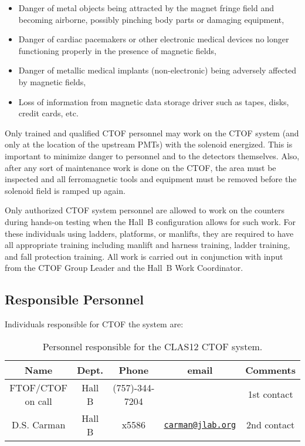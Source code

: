 \begin{itemize}
\item Danger of metal objects being attracted by the magnet fringe field and becoming airborne, 
possibly pinching body parts or damaging equipment,
\item Danger of cardiac pacemakers or other electronic medical devices no longer functioning 
properly in the presence of magnetic fields,
\item Danger of metallic medical implants (non-electronic) being adversely affected by magnetic 
fields,
\item Loss of information from magnetic data storage driver such as tapes, disks, credit cards, 
etc.
\end{itemize}

Only trained and qualified CTOF personnel may work on the CTOF system (and only at the 
location of the upstream PMTs) with the solenoid energized. This is important to minimize 
danger to personnel and to the detectors themselves. Also, after any sort of maintenance 
work is done on the CTOF, the area must be inspected and all ferromagnetic tools and 
equipment must be removed before the solenoid field is ramped up again.

Only authorized CTOF system personnel are allowed to work on the counters during hands-on
testing when the Hall~B configuration allows for such work. For these individuals using 
ladders, platforms, or manlifts, they are required to have all appropriate training 
including manlift and harness training, ladder training, and fall protection training. All 
work is carried out in conjunction with input from the CTOF Group Leader and the Hall~B Work 
Coordinator.

\subsection{Responsible Personnel}

Individuals responsible for CTOF the system are:

\begin{table}[!htb]
\centering
\begin{tabular}{|c|c|c|c|c|} \hline
Name              & Dept.  & Phone          & email & Comments \\ \hline
FTOF/CTOF on call & Hall B & (757)-344-7204 &       & 1st contact \\ \hline
D.S. Carman       & Hall B & x5586          & \href{mailto:carman@jlab.org}{\nolinkurl{carman@jlab.org}} & 2nd contact \\ \hline
\end{tabular}
\caption{Personnel responsible for the CLAS12 CTOF system.} 
\label{tb:ftof}
\end{table}

\vfil
\eject
